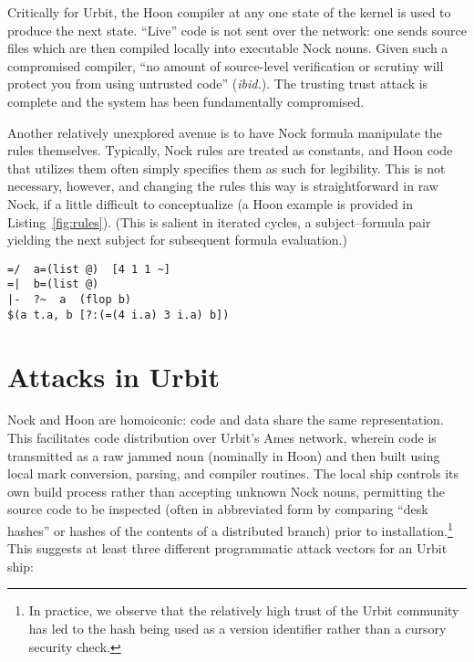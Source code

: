\documentclass[twoside]{article}
\begin{document}
Critically for Urbit, the Hoon compiler at any one state of the kernel is used to produce the next state.  ``Live'' code is not sent over the network:  one sends source files which are then compiled locally into executable Nock nouns.  Given such a compromised compiler, ``no amount of source-level verification or scrutiny will protect you from using untrusted code'' (\emph{ibid.}).  The trusting trust attack is complete and the system has been fundamentally compromised.

Another relatively unexplored avenue is to have Nock formula manipulate the rules themselves.  Typically, Nock rules are treated as constants, and Hoon code that utilizes them often simply specifies them as such for legibility.  This is not necessary, however, and changing the rules this way is straightforward in raw Nock, if a little difficult to conceptualize (a Hoon example is provided in Listing~\ref{fig:rules}).  (This is salient in iterated cycles, a subject–formula pair yielding the next subject for subsequent formula evaluation.)

\begin{lstlisting}[style=listingcode,
                   label=fig:rules,
                   caption={Hoon which can modify the rules of supplied Nock formulae arbitrarily.  For simplicity, lists are used when in practice it would be done in cells and tuples.}]
=/  a=(list @)  [4 1 1 ~]
=|  b=(list @)
|-  ?~  a  (flop b)
$(a t.a, b [?:(=(4 i.a) 3 i.a) b])
\end{lstlisting}


\section{Attacks in Urbit}

Nock and Hoon are homoiconic:  code and data share the same representation.  This facilitates code distribution over Urbit's Ames network, wherein code is transmitted as a raw jammed noun (nominally in Hoon) and then built using local mark conversion, parsing, and compiler routines.  The local ship controls its own build process rather than accepting unknown Nock nouns, permitting the source code to be inspected (often in abbreviated form by comparing “desk hashes” or hashes of the contents of a distributed branch) prior to installation.\footnote{In practice, we observe that the relatively high trust of the Urbit community has led to the hash being used as a version identifier rather than a cursory security check.}  This suggests at least three different programmatic attack vectors for an Urbit ship:
\end{document}
